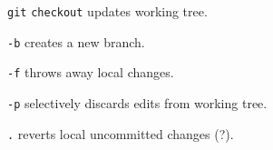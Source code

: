 %

\begin{compactenum}
\item [\texttt{git}] \texttt{checkout} updates working tree.
\item [\texttt{-b}] creates a new branch.
\item [\texttt{-f}] throws away local changes.
\item [\texttt{-p}] selectively discards edits from working tree.
\item [\texttt{.}] reverts local uncommitted changes (?).
\end{compactenum}

%